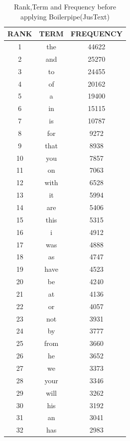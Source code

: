 \documentclass{article}
\begin{document}
\begin{table}

\caption{  Rank,Term and Frequency before applying Boilerpipe(JusText)}

\begin{center}

  \begin{tabular}{ c | c | c }

    \hline

RANK & TERM & FREQUENCY \\ \hline
1 & the & 44622 \\ \hline
2 & and & 25270 \\ \hline
3 & to & 24455 \\ \hline
4 & of & 20162 \\ \hline
5 & a & 19400 \\ \hline
6 & in & 15115 \\ \hline
7 & is & 10787 \\ \hline
8 & for & 9272 \\ \hline
9 & that & 8938 \\ \hline
10 & you & 7857 \\ \hline
11 & on & 7063 \\ \hline
12 & with & 6528 \\ \hline
13 & it & 5994 \\ \hline
14 & are & 5406 \\ \hline
15 & this & 5315 \\ \hline
16 & i & 4912 \\ \hline
17 & was & 4888 \\ \hline
18 & as & 4747 \\ \hline
19 & have & 4523 \\ \hline
20 & be & 4240 \\ \hline
21 & at & 4136 \\ \hline
22 & or & 4057 \\ \hline
23 & not & 3931 \\ \hline
24 & by & 3777 \\ \hline
25 & from & 3660 \\ \hline
26 & he & 3652 \\ \hline
27 & we & 3373 \\ \hline
28 & your & 3346 \\ \hline
29 & will & 3262 \\ \hline
30 & his & 3192 \\ \hline
31 & an & 3041 \\ \hline
32 & has & 2983 \\ \hline

\end{tabular}
\end{center}
\end{table}
\end{document}
